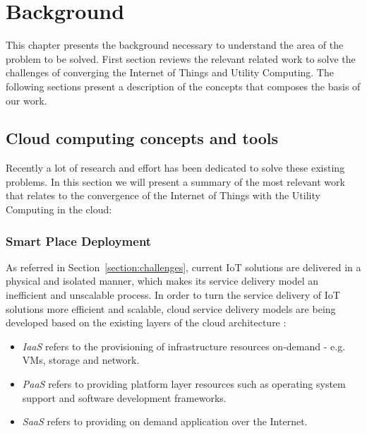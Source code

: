 
\chapter{Background}
\label{chapter:background}
This chapter presents the background necessary to understand the area of the problem to be solved.
First section reviews the relevant related work to solve the challenges of converging the Internet
of Things and Utility Computing. The following sections present a description of the concepts
that composes the basis of our work.

\section{Cloud computing concepts and tools}
\label{sub:cloud_concepts_tools}
Recently a lot of research and effort has been dedicated to solve these existing problems. In this
section we will present a summary of the most relevant work that relates to the convergence of the
Internet of Things with the Utility Computing in the cloud:

\subsection{Smart Place Deployment}
\label{sub:smart_place_deployment}
As referred in Section~\ref{section:challenges}, current \gls{IoT} solutions are delivered in a physical
and isolated manner, which makes its service delivery model an inefficient and unscalable process.
In order to turn the service delivery of \gls{IoT} solutions more efficient and scalable, cloud service
delivery models are being developed based on the existing layers of the cloud architecture \cite{zhang2010cloud}:

\begin{itemize}
  \item\textit{\gls{IaaS}} refers to the provisioning of infrastructure resources on-demand - e.g.
  \glspl{VM}, storage and network.
  \item\textit{\gls{PaaS}} refers to providing platform layer resources such as operating system support
  and software development frameworks.
  \item\textit{\gls{SaaS}} refers to providing on demand application over the Internet.
\end{itemize}

